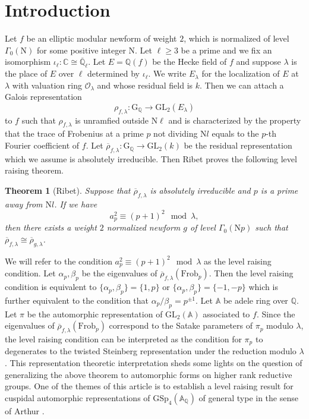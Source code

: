 \documentclass[10pt]{amsart}
\numberwithin{equation}{section}
\newtheorem{theorem}[equation]{Theorem}
\theoremstyle{definition}
\def\GL{\mathrm{GL}}
\def\GSp{\mathrm{GSp}}
\def\Frob{\mathrm{Frob}}
\def\calO{\mathcal{O}}
\def\AAA{\mathbb{A}}
\def\CC{\mathbb{C}}
\def\QQ{\mathbb{Q}}
\def\rmG{\mathrm{G}}
\def\rmN{\mathrm{N}}
\begin{document}
\section{Introduction}
Let $f$ be an elliptic modular newform of weight $2$, which is normalized of level $\Gamma_{0}(\rmN)$ for some positive integer $\rmN$. Let $\ell\geq 3$ be a prime and we fix an isomorphism $\iota_{\ell}: \CC\cong\overline{\QQ}_{\ell}$.  Let $E=\QQ(f)$ be the Hecke field of $f$ and suppose $\lambda$ is the place of $E$ over $\ell$ determined by $\iota_{\ell}$. We write $E_{\lambda}$ for the localization of $E$ at $\lambda$ with valuation ring $\calO_{\lambda}$ and whose residual field is $k$. Then we can attach a Galois representation 
\begin{equation*}
\rho_{f,\lambda}: \rmG_{\QQ}\rightarrow \GL_{2}(E_{\lambda})
\end{equation*}
 to $f$ such that $\rho_{f,\lambda}$ is unramfied outside $\rmN \ell$ and is characterized by the property that the trace of Frobenius at a prime $p$ not dividing $\rmN l$ equals to the $p$-th Fourier coefficient of $f$.  Let $\overline{\rho}_{f,\lambda}: \rmG_{\QQ}\rightarrow \GL_{2}(k)
$ be the residual representation which we assume is absolutely irreducible. Then Ribet \cite{ribet} proves the following level raising theorem.
\begin{theorem}[Ribet]
Suppose that $\overline{\rho}_{f,\lambda}$ is absolutely irreducible and $p$ is a prime away from $\rmN l$. If we have
\begin{equation*}
a^{2}_{p}\equiv (p+1)^{2}\mod \lambda,
\end{equation*}
then there exists a weight $2$ normalized newform $g$ of level $\Gamma_{0}(\rmN p)$ such that  $\overline{\rho}_{f,\lambda}\cong \overline{\rho}_{g,\lambda}$.
\end{theorem}
We will refer to the condition $a^{2}_{p}\equiv (p+1)^{2}\mod \lambda$ as the level raising condition. Let $\alpha_{p}, \beta_{p}$ be the eigenvalues of $\overline{\rho}_{f,\lambda}(\Frob_{p})$. Then the level raising condition is equivalent to $\{\alpha_{p}, \beta_{p}\}=\{1, p\}$ or $\{\alpha_{p}, \beta_{p}\}=\{-1, -p\}$ which is further equivalent to the condition that $\alpha_{p}/\beta_{p}=p^{\pm1}$. Let $\AAA$ be adele ring over $\QQ$. Let $\pi$ be the automorphic representation of $\GL_{2}(\mathbb{A})$ associated to $f$. Since  the eigenvalues of $\overline{\rho}_{f,\lambda}(\Frob_{p})$ correspond to the Satake parameters of $\pi_{p}$ modulo $\lambda$, the level raising condition can be interpreted as the condition for $\pi_{p}$ to degenerates to the twisted Steinberg representation under the reduction modulo $\lambda$. This representation theoretic interpretation sheds some lights on the question of generalizing the above theorem to automorphic forms on higher rank reductive groups. One of the themes of this article is to establish a level raising result for cuspidal automorphic representations of $\GSp_{4}(\mathbb{A}_{\QQ})$ of general type in the sense of Arthur \cite{Arthur-GSp}. 
\end{document}
